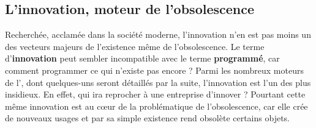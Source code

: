 \subsection{L'innovation, moteur de l'obsolescence}
Recherchée, acclamée dans la société moderne, l'innovation n'en est pas moins un des vecteurs majeurs de l'existence même de l'obsolescence. Le terme d'\textbf{innovation} peut sembler incompatible avec le terme \textbf{programmé}, car comment programmer ce qui n'existe pas encore ?
\medbreak
Parmi les nombreux moteurs de l'\op, dont quelques-uns seront détaillés par la suite, l'innovation est l'un des plus insidieux. En effet, qui ira reprocher à une entreprise d'innover ?
Pourtant cette même innovation est au cœur de la problématique de l'obsolescence, car elle crée de nouveaux usages et par sa simple existence rend obsolète certains objets.

